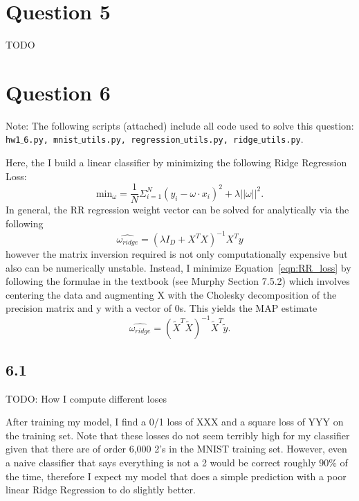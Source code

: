 \documentclass[12pt]{amsart}
\begin{document}

\section*{Question 5}
TODO


\section*{Question 6}

Note: The following scripts (attached) include all code used to solve this question: {\tt hw1$\_$6.py, mnist$\_$utils.py, regression$\_$utils.py, ridge$\_$utils.py}.

Here, the I build a linear classifier by minimizing the following Ridge Regression Loss:
\begin{equation} \label{eqn:RR_loss}
\text{min}_{\omega} = \frac{1}{N} \Sigma_{i = 1}^N (y_i - \omega \cdot x_i)^2 + \lambda || \omega ||^2.
\end{equation}
In general, the RR regression weight vector can be solved for analytically via the following
\begin{equation} \label{eqn:RR_w}
\hat{\omega_{ridge}} = (\lambda I_D + X^T X)^{-1} X^T y
\end{equation}
however the matrix inversion required is not only computationally expensive but also can be numerically unstable.  Instead, I minimize Equation~\ref{eqn:RR_loss} by following the formulae in the textbook (see Murphy Section 7.5.2) which involves centering the data and augmenting X with the Cholesky decomposition of the precision matrix and y with a vector of 0s.  This yields the MAP estimate
\begin{equation} \label{eqn:RR_w_murphy}
\hat{\omega_{ridge}} = (\tilde{X}^T \tilde{X})^{-1} \tilde{X}^T \tilde{y}.
\end{equation}

\subsection*{6.1}


TODO: How I compute different loses

After training my model, I find a 0/1 loss of XXX and a square loss of YYY on the training set.  Note that these losses do not seem terribly high for my classifier given that there are of order 6,000 2's in the MNIST training set.  However, even a naive classifier that says everything is not a 2 would be correct roughly $90\%$ of the time, therefore I expect my model that does a simple prediction with a poor linear Ridge Regression to do slightly better.
\end{document}
